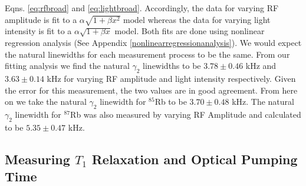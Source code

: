 Eqns. \ref{eq:rfbroad} and \ref{eq:lightbroad}. Accordingly, the data for varying RF amplitude is fit to a $\alpha \sqrt{1+\beta x^2}$ model whereas the data for varying light intensity is fit to a $\alpha \sqrt{1+\beta x}$ model.  Both fits are done using nonlinear regression analysis (See Appendix \ref{nonlinearregressionanalysis}).  We would expect the natural linewidths for each measurement process to be the same.  From our fitting analysis we find the natural $\gamma_2$ linewidths to be $3.78 \pm 0.46$ kHz and $3.63 \pm 0.14$ kHz for varying RF amplitude and light intensity respectively.  Given the error for this measurement, the two values are in good agreement. From here on we take the natural $\gamma_2$ linewidth for $^{85}$Rb to be $3.70 \pm 0.48$ kHz. The natural  $\gamma_2$ linewidth for $^{87}$Rb was also measured by varying RF Amplitude and calculated to be $5.35 \pm 0.47$ kHz.

\subsection{Measuring $T_1$ Relaxation and Optical Pumping Time}\label{MeasuringT1RelaxationandOpticalPumpingTime}

